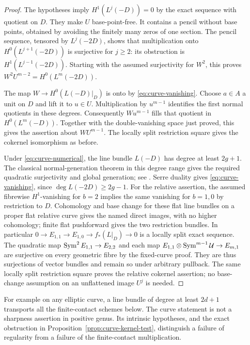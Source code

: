 \begin{proof}
The hypotheses imply $H^1(L^j(-D))=0$ by the exact sequence with
quotient on $D$. They make $U$ base-point-free. It contains a pencil
without base points, obtained by avoiding the finitely many zeros of
one section. The pencil sequence, tensored by $L^j(-2D)$, shows that
multiplication onto $H^0(L^{j+1}(-2D))$ is surjective for $j\ge2$:
its obstruction is $H^1(L^{j-1}(-2D))$. Starting with the assumed
surjectivity for $W^2$, this proves
$W^2U^{m-2}=H^0(L^m(-2D))$.

The map $W\to H^0(L(-D)|_D)$ is onto by \eqref{eq:curve-vanishing}.
Choose $a\in A$ a unit on $D$ and lift it to $u\in U$.
Multiplication by $u^{m-1}$ identifies the first normal quotients in
these degrees. Consequently $Wu^{m-1}$ fills that quotient in
$H^0(L^m(-D))$. Together with the double-vanishing space just proved,
this gives the assertion about $WU^{m-1}$. The locally split
restriction square gives the cokernel isomorphism as before.

Under \eqref{eq:curve-numerical}, the line bundle $L(-D)$ has degree
at least $2g+1$. The classical normal-generation theorem in this
degree range gives the required quadratic surjectivity and global
generation; see \cite[p.~73, Introduction]{GL86}.
Serre duality gives \eqref{eq:curve-vanishing}, since
$\deg L(-2D)\ge2g-1$. For the relative assertion, the assumed fibrewise $H^1$-vanishing
for $b=2$ implies the same vanishing for $b=1,0$ by restriction to
$D$. Cohomology and base change for these flat line bundles on a
proper flat relative curve gives the named direct images, with no
higher cohomology; finite flat pushforward gives the two restriction
bundles. In particular $0\to E_{1,1}\to E_{1,0}\to f_*(L|_D)\to0$
is a locally split exact sequence. The quadratic map
$\operatorname{Sym}^2E_{1,1}\to E_{2,2}$ and each map
$E_{1,1}\otimes\operatorname{Sym}^{m-1}\mathcal U\to E_{m,1}$ are surjective
on every geometric fibre by the fixed-curve proof. They are thus
surjections of vector bundles and remain so under arbitrary
pullback. The same locally split restriction square proves the
relative cokernel assertion; no base-change assumption on an
unflattened image $U^j$ is needed.
\end{proof}

For example on any elliptic curve, a line bundle of degree at least
$2d+1$ transports all the finite-contact schemes below. The curve
statement is not a sharpness assertion in positive genus. Its
intrinsic hypotheses, and the exact obstruction in
Proposition~\ref{prop:curve-kernel-test}, distinguish a failure of
regularity from a failure of the finite-contact multiplication.
